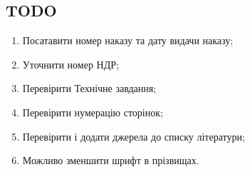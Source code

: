 \documentclass[ukrainian,utf8,simple,floatsubsection, hpadding=5mm,equationsubsection,]{eskdtext}
\begin{document}
\newpage

\subsection*{TODO}
\begin{enumerate}
 \item Посатавити номер наказу та дату видачи наказу;
 \item Уточнити номер НДР;
 \item Перевірити Технічне завдання;
 \item Перевірити нумерацію сторінок;
 \item Перевірити і додати джерела до списку літератури;
 \item Можливо зменшити шрифт в прізвищах.
\end{enumerate}

\newpage
{}


\newpage
{}


\newpage
\tableofcontents

\newpage
{}
\printnomenclature

\newpage
{}


\newpage
{}

\newpage
{}

\newpage
{}

\newpage
{}

\newpage
{}

\newpage
{}

\newpage
{}

% 
\newpage
{}

% 
\newpage
{}

\newpage
{}

% 
\end{document}
